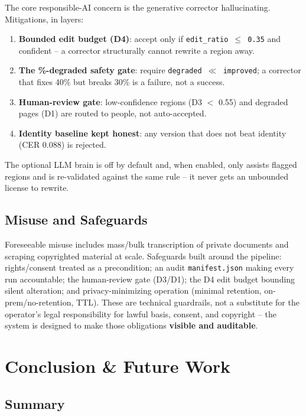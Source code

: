 \documentclass[12pt,a4paper]{article}
\begin{document}
The core responsible-AI concern is the generative corrector hallucinating. Mitigations, in layers:
\begin{enumerate}\setlength\itemsep{0.1em}
  \item \textbf{Bounded edit budget (D4)}: accept only if \texttt{edit\_ratio $\le$ 0.35} and confident -- a corrector structurally cannot rewrite a region away.
  \item \textbf{The \%-degraded safety gate}: require \texttt{degraded $\ll$ improved}; a corrector that fixes 40\% but breaks 30\% is a failure, not a success.
  \item \textbf{Human-review gate}: low-confidence regions (D3 $<$ 0.55) and degraded pages (D1) are routed to people, not auto-accepted.
  \item \textbf{Identity baseline kept honest}: any version that does not beat identity (CER 0.088) is rejected.
\end{enumerate}
The optional LLM brain is off by default and, when enabled, only assists flagged regions and is re-validated against the same rule -- it never gets an unbounded license to rewrite.

\subsection{Misuse and Safeguards}

Foreseeable misuse includes mass/bulk transcription of private documents and scraping copyrighted material at scale. Safeguards built around the pipeline: rights/consent treated as a precondition; an audit \texttt{manifest.json} making every run accountable; the human-review gate (D3/D1); the D4 edit budget bounding silent alteration; and privacy-minimizing operation (minimal retention, on-prem/no-retention, TTL). These are technical guardrails, not a substitute for the operator's legal responsibility for lawful basis, consent, and copyright -- the system is designed to make those obligations \textbf{visible and auditable}.

\section{Conclusion \& Future Work}

\subsection{Summary}
\end{document}
